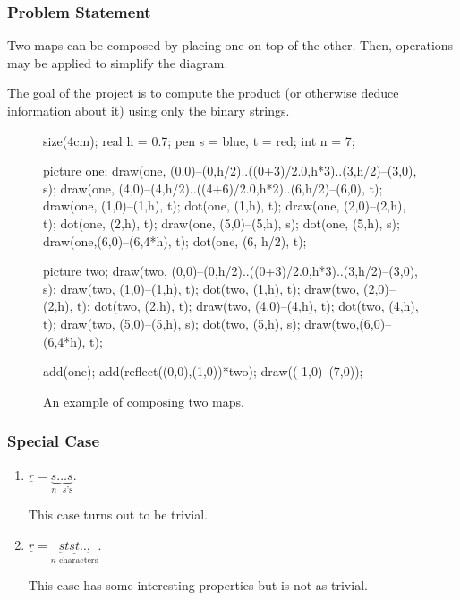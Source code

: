 \documentclass[pdf]{beamer}
\def\ii{\item}
\theoremstyle{definition}
\def\ul#1{\underline{#1}}
\begin{document}
\begin{frame}[fragile]
	\frametitle{Problem Statement}
	Two maps can be composed by placing one on top of the other.  Then, operations may be applied to simplify the diagram.

	The goal of the project is to \alert{compute the product} (or otherwise deduce information about it) using \alert{only the binary strings}.
	\begin{figure}[ht]
		\centering
		\begin{asy}
		size(4cm);
		real h = 0.7;
		pen s = blue, t = red;
		int n = 7;

		picture one;
		draw(one, (0,0)--(0,h/2)..((0+3)/2.0,h*3)..(3,h/2)--(3,0), s);
		draw(one, (4,0)--(4,h/2)..((4+6)/2.0,h*2)..(6,h/2)--(6,0), t);
		draw(one, (1,0)--(1,h), t);
		dot(one, (1,h), t);
		draw(one, (2,0)--(2,h), t);
		dot(one, (2,h), t);
		draw(one, (5,0)--(5,h), s);
		dot(one, (5,h), s);
		draw(one,(6,0)--(6,4*h), t);
		dot(one, (6, h/2), t);

		picture two;
		draw(two, (0,0)--(0,h/2)..((0+3)/2.0,h*3)..(3,h/2)--(3,0), s);
		draw(two, (1,0)--(1,h), t);
		dot(two, (1,h), t);
		draw(two, (2,0)--(2,h), t);
		dot(two, (2,h), t);
		draw(two, (4,0)--(4,h), t);
		dot(two, (4,h), t);
		draw(two, (5,0)--(5,h), s);
		dot(two, (5,h), s);
		draw(two,(6,0)--(6,4*h), t);

		add(one); add(reflect((0,0),(1,0))*two);
		draw((-1,0)--(7,0));
		\end{asy}
		\caption{An example of composing two maps.}
	\end{figure}
\end{frame}

\begin{frame}
	\frametitle{Special Case}
	\begin{enumerate}
		\ii $\ul r = \underbrace{s\dots s}_{\text{$n$ $s$'s}}$.
		\pause \par This case turns out to be trivial.
		\pause
		\ii $\ul r = \underbrace{stst\dots}_{\text{$n$ characters}}$.
		\par This case has some interesting properties but is not as trivial.
	\end{enumerate}
\end{frame}
\end{document}
